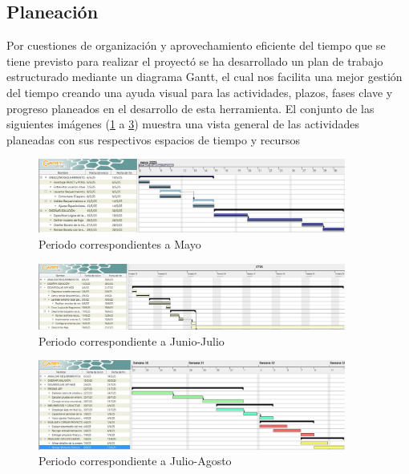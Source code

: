 \documentclass[12pt,letterpaper,spanish]{report}
\begin{document}
\subsection{Planeación}

Por cuestiones de organización y aprovechamiento eficiente del tiempo que se tiene previsto para realizar el proyectó se ha desarrollado un plan de trabajo estructurado mediante un diagrama Gantt, el cual nos facilita una mejor gestión del tiempo creando una ayuda visual para las actividades, plazos, fases clave y progreso planeados en el desarrollo de esta herramienta. El conjunto de las siguientes imágenes (\ref{a03} a \ref{a05}) muestra una vista general de las actividades planeadas con sus respectivos espacios de tiempo y recursos

\begin{figure}[htp]
  \centering
  \includegraphics[width=0.9\textwidth]{Gantt_Mayo_30.jpg}
  \caption{Periodo correspondientes a Mayo}\label{a03}
\end{figure}

\begin{figure}[htp]
  \centering
  \includegraphics[width=0.9\textwidth]{Gantt_Week_23_30.jpg}
  \caption{Periodo correspondiente a Junio-Julio}\label{a04}
\end{figure}

\begin{figure}[htp]
  \centering
  \includegraphics[width=0.9\textwidth]{Gantt_Week_30_32.jpg}
  \caption{Periodo correspondiente a Julio-Agosto}\label{a05}
\end{figure}
\end{document}
